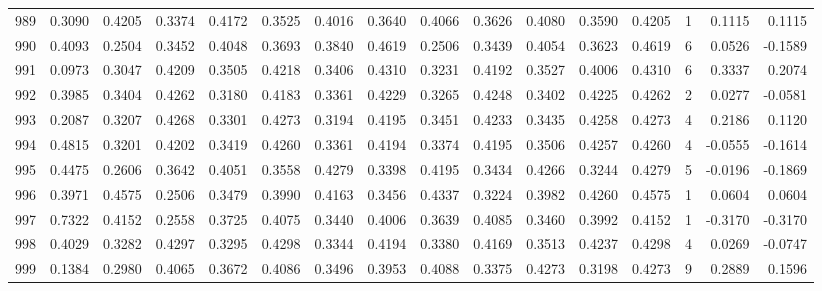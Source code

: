\begin{tabular}{lrrrrrrrrrrrrrrr}
989 &      0.3090 &  0.4205 &  0.3374 &  0.4172 &  0.3525 &  0.4016 &  0.3640 &  0.4066 &  0.3626 &  0.4080 &   0.3590 &     0.4205 &      1 &                    0.1115 &                     0.1115 \\
990 &      0.4093 &  0.2504 &  0.3452 &  0.4048 &  0.3693 &  0.3840 &  0.4619 &  0.2506 &  0.3439 &  0.4054 &   0.3623 &     0.4619 &      6 &                    0.0526 &                    -0.1589 \\
991 &      0.0973 &  0.3047 &  0.4209 &  0.3505 &  0.4218 &  0.3406 &  0.4310 &  0.3231 &  0.4192 &  0.3527 &   0.4006 &     0.4310 &      6 &                    0.3337 &                     0.2074 \\
992 &      0.3985 &  0.3404 &  0.4262 &  0.3180 &  0.4183 &  0.3361 &  0.4229 &  0.3265 &  0.4248 &  0.3402 &   0.4225 &     0.4262 &      2 &                    0.0277 &                    -0.0581 \\
993 &      0.2087 &  0.3207 &  0.4268 &  0.3301 &  0.4273 &  0.3194 &  0.4195 &  0.3451 &  0.4233 &  0.3435 &   0.4258 &     0.4273 &      4 &                    0.2186 &                     0.1120 \\
994 &      0.4815 &  0.3201 &  0.4202 &  0.3419 &  0.4260 &  0.3361 &  0.4194 &  0.3374 &  0.4195 &  0.3506 &   0.4257 &     0.4260 &      4 &                   -0.0555 &                    -0.1614 \\
995 &      0.4475 &  0.2606 &  0.3642 &  0.4051 &  0.3558 &  0.4279 &  0.3398 &  0.4195 &  0.3434 &  0.4266 &   0.3244 &     0.4279 &      5 &                   -0.0196 &                    -0.1869 \\
996 &      0.3971 &  0.4575 &  0.2506 &  0.3479 &  0.3990 &  0.4163 &  0.3456 &  0.4337 &  0.3224 &  0.3982 &   0.4260 &     0.4575 &      1 &                    0.0604 &                     0.0604 \\
997 &      0.7322 &  0.4152 &  0.2558 &  0.3725 &  0.4075 &  0.3440 &  0.4006 &  0.3639 &  0.4085 &  0.3460 &   0.3992 &     0.4152 &      1 &                   -0.3170 &                    -0.3170 \\
998 &      0.4029 &  0.3282 &  0.4297 &  0.3295 &  0.4298 &  0.3344 &  0.4194 &  0.3380 &  0.4169 &  0.3513 &   0.4237 &     0.4298 &      4 &                    0.0269 &                    -0.0747 \\
999 &      0.1384 &  0.2980 &  0.4065 &  0.3672 &  0.4086 &  0.3496 &  0.3953 &  0.4088 &  0.3375 &  0.4273 &   0.3198 &     0.4273 &      9 &                    0.2889 &                     0.1596 \\
\bottomrule
\end{tabular}
